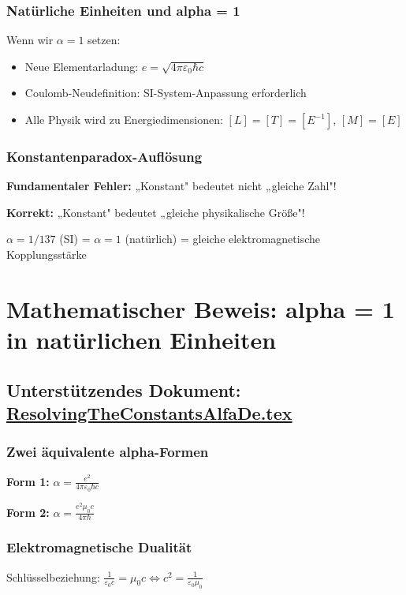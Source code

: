 \documentclass[12pt,a4paper]{report}
\begin{document}
	\subsubsection{Natürliche Einheiten und alpha = 1}
	Wenn wir $\alpha = 1$ setzen:
	\begin{itemize}
		\item Neue Elementarladung: $e = \sqrt{4\pi \varepsilon_0 \hbar c}$
		\item Coulomb-Neudefinition: SI-System-Anpassung erforderlich
		\item Alle Physik wird zu Energiedimensionen: $[L] = [T] = [E^{-1}]$, $[M] = [E]$
	\end{itemize}
	
	\subsubsection{Konstantenparadox-Auflösung}
	\textbf{Fundamentaler Fehler:} „Konstant" bedeutet nicht „gleiche Zahl"!
	
	\textbf{Korrekt:} „Konstant" bedeutet „gleiche physikalische Größe"!
	
	$\alpha = 1/137$ (SI) = $\alpha = 1$ (natürlich) = gleiche elektromagnetische Kopplungsstärke
	
	\section{Mathematischer Beweis: alpha = 1 in natürlichen Einheiten}
	\subsection{Unterstützendes Dokument: \href{https://github.com/jpascher/T0-Time-Mass-Duality/tree/main/2/pdf/ResolvingTheConstantsAlfaDe.pdf}{ResolvingTheConstantsAlfaDe.tex}}
	
	\subsubsection{Zwei äquivalente alpha-Formen}
	\textbf{Form 1:} $\alpha = \frac{e^2}{4\pi \varepsilon_0 \hbar c}$
	
	\textbf{Form 2:} $\alpha = \frac{e^2 \mu_0 c}{4\pi \hbar}$
	
	\subsubsection{Elektromagnetische Dualität}
	Schlüsselbeziehung: $\frac{1}{\varepsilon_0 c} = \mu_0 c \Leftrightarrow c^2 = \frac{1}{\varepsilon_0 \mu_0}$
	
\end{document}

